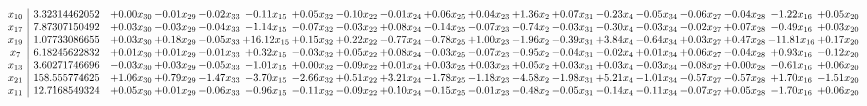 \documentclass[9pt]{article}
\begin{document}
 \[\begin{array}{c| c c@{\hskip 2pt} c@{\hskip 2pt} c@{\hskip 2pt} c@{\hskip 2pt} c@{\hskip 2pt} c@{\hskip 2pt} c@{\hskip 2pt} c@{\hskip 2pt} c@{\hskip 2pt} c@{\hskip 2pt} c@{\hskip 2pt} c@{\hskip 2pt} c@{\hskip 2pt} c@{\hskip 2pt} c@{\hskip 2pt} c@{\hskip 2pt} c@{\hskip 2pt} }
 x_{10}   &  3.32314462052 & +  0.00 x_{30} & -0.01 x_{29} & -0.02 x_{33} & -0.11 x_{15} & +  0.05 x_{32} & -0.10 x_{22} & -0.01 x_{24} & +  0.06 x_{25} & +  0.04 x_{23} & +  1.36 x_{2} & +  0.07 x_{31} & -0.23 x_{4} & -0.05 x_{34} & -0.06 x_{27} & -0.04 x_{28} & -1.22 x_{16} & +  0.05 x_{20}\\
 x_{17}   &  7.87307150492 & +  0.03 x_{30} & -0.03 x_{29} & -0.04 x_{33} & -1.14 x_{15} & -0.07 x_{32} & -0.03 x_{22} & +  0.08 x_{24} & -0.14 x_{25} & -0.07 x_{23} & -0.74 x_{2} & -0.03 x_{31} & -0.30 x_{4} & -0.03 x_{34} & -0.02 x_{27} & +  0.07 x_{28} & -0.49 x_{16} & +  0.03 x_{20}\\
 x_{19}   &  1.07733086655 & +  0.03 x_{30} & +  0.18 x_{29} & -0.05 x_{33} & + 16.12 x_{15} & +  0.15 x_{32} & +  0.22 x_{22} & -0.77 x_{24} & -0.78 x_{25} & +  1.00 x_{23} & -1.96 x_{2} & -0.39 x_{31} & +  3.84 x_{4} & -0.64 x_{34} & +  0.03 x_{27} & +  0.47 x_{28} & -11.81 x_{16} & +  0.17 x_{20}\\
 x_{7}   &  6.18245622832 & +  0.01 x_{30} & +  0.01 x_{29} & -0.01 x_{33} & +  0.32 x_{15} & -0.03 x_{32} & +  0.05 x_{22} & +  0.08 x_{24} & -0.03 x_{25} & -0.07 x_{23} & -0.95 x_{2} & -0.04 x_{31} & -0.02 x_{4} & +  0.01 x_{34} & +  0.06 x_{27} & -0.04 x_{28} & +  0.93 x_{16} & -0.12 x_{20}\\
 x_{13}   &  3.60271746696 & -0.03 x_{30} & +  0.03 x_{29} & -0.05 x_{33} & -1.01 x_{15} & +  0.00 x_{32} & -0.09 x_{22} & +  0.01 x_{24} & +  0.03 x_{25} & +  0.03 x_{23} & +  0.05 x_{2} & +  0.03 x_{31} & +  0.03 x_{4} & -0.03 x_{34} & -0.08 x_{27} & +  0.00 x_{28} & -0.61 x_{16} & +  0.06 x_{20}\\
 x_{21}   &  158.555774625 & +  1.06 x_{30} & +  0.79 x_{29} & -1.47 x_{33} & -3.70 x_{15} & -2.66 x_{32} & +  0.51 x_{22} & +  3.21 x_{24} & -1.78 x_{25} & -1.18 x_{23} & -4.58 x_{2} & -1.98 x_{31} & +  5.21 x_{4} & -1.01 x_{34} & -0.57 x_{27} & -0.57 x_{28} & +  1.70 x_{16} & -1.51 x_{20}\\
 x_{11}   &  12.7168549324 & +  0.05 x_{30} & +  0.01 x_{29} & -0.06 x_{33} & -0.96 x_{15} & -0.11 x_{32} & -0.09 x_{22} & +  0.10 x_{24} & -0.15 x_{25} & -0.01 x_{23} & -0.48 x_{2} & -0.05 x_{31} & -0.14 x_{4} & -0.11 x_{34} & -0.07 x_{27} & +  0.05 x_{28} & -1.70 x_{16} & +  0.06 x_{20}\\

\end{array}\]
\end{document}
